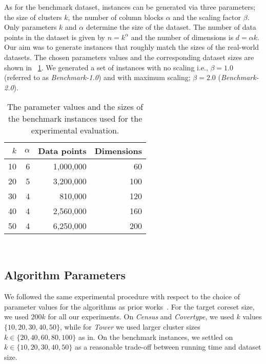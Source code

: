 As for the benchmark dataset, instances can be generated via three parameters; the size of clusters $k$, the number of column blocks $\alpha$ and the scaling factor $\beta$. Only parameters $k$ and $\alpha$ determine the size of the dataset. The number of data points in the dataset is given by $n=k^{\alpha}$ and the number of dimensions is $d=\alpha k$. Our aim was to generate instances that roughly match the sizes of the real-world datasets. The chosen parameters values and the corresponding dataset sizes are shown in ~\cref{tab:benchmark-instances-overview}. We generated a set of instances with no scaling i.e., $\beta=1.0$ (referred to as \textit{Benchmark-1.0}) and with maximum scaling; $\beta = 2.0$ (\textit{Benchmark-2.0}).



%
\begin{table}
	\begin{center}%
	\caption{The parameter values and the sizes of the benchmark instances used for the experimental evaluation.}
	\label{tab:benchmark-instances-overview}
	\begin{tabular}{rrrr}
		\toprule
        $k$
		    & $\alpha$
		    & Data points
		    & Dimensions
            \\
		\midrule
        10
    		& 6
    		& 1,000,000
    		& 60
    		\\
        20
    		& 5
    		& 3,200,000
    		& 100
    		\\
        30
    		& 4
    		& 810,000
    		& 120
    		\\
        40
    		& 4
    		& 2,560,000
    		& 160
    		\\
        50
    		& 4
    		& 6,250,000
    		& 200
    		\\
		\bottomrule
	\end{tabular}\\
	\end{center}
\end{table}

\subsection{Algorithm Parameters}
We followed the same experimental procedure with respect to the choice of parameter values for the algorithms as prior works~\cite{FGSSS13, ackermann2012streamkmpp}. For the target coreset size, we used $200k$ for all our experiments. On \textit{Census} and \textit{Covertype}, we used $k$ values $\{10, 20, 30, 40, 50\}$, while for \textit{Tower} we used larger cluster sizes $k \in \{20, 40, 60, 80, 100\}$ as in. On the benchmark instances, we settled on $k \in \{10, 20, 30, 40, 50\}$ as a reasonable trade-off between running time and dataset size.
